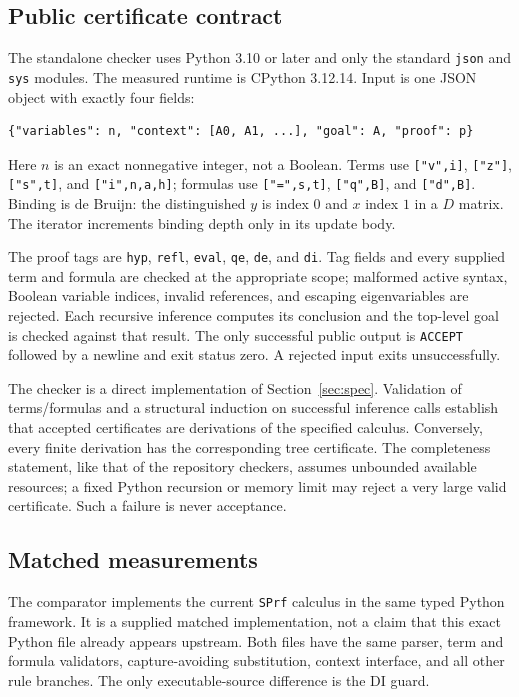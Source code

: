 \documentclass[11pt]{article}
\theoremstyle{definition}\newtheorem{definition}[theorem]{Definition}
\begin{document}
\subsection{Public certificate contract}
The standalone checker uses Python 3.10 or later and only the standard
\texttt{json} and \texttt{sys} modules. The measured runtime is CPython
3.12.14. Input is one JSON object with exactly four fields:
\begin{lstlisting}
{"variables": n, "context": [A0, A1, ...], "goal": A, "proof": p}
\end{lstlisting}
Here $n$ is an exact nonnegative integer, not a Boolean. Terms use
\texttt{["v",i]}, \texttt{["z"]}, \texttt{["s",t]}, and
\texttt{["i",n,a,h]}; formulas use \texttt{["=",s,t]},
\texttt{["q",B]}, and \texttt{["d",B]}. Binding is de Bruijn:
the distinguished $y$ is index $0$ and $x$ index $1$ in a $D$ matrix.
The iterator increments binding depth only in its update body.

The proof tags are \texttt{hyp}, \texttt{refl}, \texttt{eval},
\texttt{qe}, \texttt{de}, and \texttt{di}. Tag fields and every supplied
term and formula are checked at the appropriate scope; malformed active
syntax, Boolean variable indices, invalid references, and escaping
eigenvariables are rejected. Each recursive inference computes its
conclusion and the top-level goal is checked against that result.
The only successful public output is \texttt{ACCEPT} followed by a
newline and exit status zero. A rejected input exits unsuccessfully.

The checker is a direct implementation of Section~\ref{sec:spec}.
Validation of terms/formulas and a structural induction on successful
inference calls establish that accepted certificates are derivations of
the specified calculus. Conversely, every finite derivation has the
corresponding tree certificate. The completeness statement, like that
of the repository checkers, assumes unbounded available resources;
a fixed Python recursion or memory limit may reject a very large valid
certificate. Such a failure is never acceptance.

\subsection{Matched measurements}
The comparator implements the current \texttt{SPrf} calculus in the
same typed Python framework. It is a supplied matched implementation,
not a claim that this exact Python file already appears upstream.
Both files have the same parser, term and formula validators,
capture-avoiding substitution, context interface, and all other rule
branches. The only executable-source difference is the DI guard.
\end{document}
